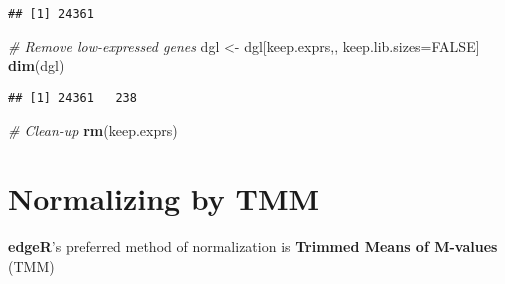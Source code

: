 \documentclass[]{book}
\newenvironment{Shaded}{\begin{snugshade}}{\end{snugshade}}
\newcommand{\KeywordTok}[1]{\textcolor[rgb]{0.13,0.29,0.53}{\textbf{#1}}}
\newcommand{\DataTypeTok}[1]{\textcolor[rgb]{0.13,0.29,0.53}{#1}}
\newcommand{\StringTok}[1]{\textcolor[rgb]{0.31,0.60,0.02}{#1}}
\newcommand{\CommentTok}[1]{\textcolor[rgb]{0.56,0.35,0.01}{\textit{#1}}}
\newcommand{\OtherTok}[1]{\textcolor[rgb]{0.56,0.35,0.01}{#1}}
\newcommand{\OperatorTok}[1]{\textcolor[rgb]{0.81,0.36,0.00}{\textbf{#1}}}
\newcommand{\NormalTok}[1]{#1}
\begin{document}
\begin{Shaded}
\end{Shaded}

\begin{verbatim}
## [1] 24361
\end{verbatim}

\begin{Shaded}
\begin{Highlighting}[]
\CommentTok{# Remove low-expressed genes }
\NormalTok{dgl <-}\StringTok{ }\NormalTok{dgl[keep.exprs,, keep.lib.sizes=}\OtherTok{FALSE}\NormalTok{]}
\KeywordTok{dim}\NormalTok{(dgl)}
\end{Highlighting}
\end{Shaded}

\begin{verbatim}
## [1] 24361   238
\end{verbatim}

\begin{Shaded}
\begin{Highlighting}[]
\CommentTok{# Clean-up}
\KeywordTok{rm}\NormalTok{(keep.exprs)}
\end{Highlighting}
\end{Shaded}

\section{Normalizing by TMM}\label{normalizing-by-tmm}

\textbf{edgeR}'s preferred method of normalization is \textbf{Trimmed
Means of M-values} (TMM)

\begin{Shaded}
\end{Shaded}
\end{document}
